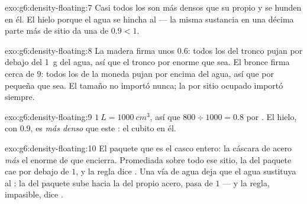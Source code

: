 \begin{solution}{exo:g6:density-floating:7}
Casi todos los  son más densos que su propio  y
se hunden en él. El hielo  porque el agua se hincha al
 --- la misma sustancia en una décima parte más de sitio da
una  de $0.9 < 1$.
\end{solution}

\begin{solution}{exo:g6:density-floating:8}
La madera firma unos $0.6$: todos los  del
tronco pujan por debajo del \qty{1}{g} del agua, así que el tronco
 por enorme que sea. El bronce firma cerca de $9$: todos los
 de la moneda pujan por encima del agua, así que
 por pequeña que sea. El tamaño no importó nunca; la
 por sitio ocupado importó siempre.
\end{solution}

\begin{solution}{exo:g6:density-floating:9}
$\qty{1}{L} = \qty{1000}{cm^3}$, así que $800 \div 1000 = 0.8$
 por . El hielo, con $0.9$, es
\emph{más denso} que este : el cubito  en él.
\end{solution}

\begin{solution}{exo:g6:density-floating:10}
El paquete que  es el casco entero: la cáscara de acero
\emph{más} el enorme  de  que encierra. Promediada
sobre todo ese sitio, la  del paquete cae por debajo de $1$,
y la regla dice . Una vía de agua deja que el agua sustituya
al : la  del paquete sube hacia la del propio
acero, pasa de $1$ --- y la regla, impasible, dice .
\end{solution}

